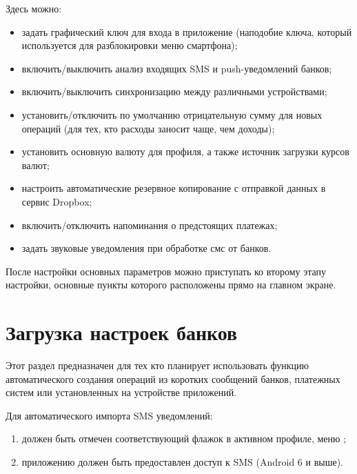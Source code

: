 \documentclass[a4paper,10pt,russian]{sphinxmanual}
\begin{document}
Здесь можно:
\begin{itemize}
\item {} 
задать графический ключ для входа в приложение (наподобие ключа, который используется для разблокировки меню смартфона);

\item {} 
включить/выключить анализ входящих SMS и push-уведомлений банков;

\item {} 
включить/выключить синхронизацию между различными устройствами;

\item {} 
установить/отключить по умолчанию отрицательную сумму для новых операций (для тех, кто расходы заносит чаще, чем доходы);

\item {} 
установить основную валюту для профиля, а также источник загрузки курсов валют;

\item {} 
настроить автоматические резервное копирование с отправкой данных в сервис Dropbox;

\item {} 
включить/отключить напоминания о предстоящих платежах;

\item {} 
задать звуковые уведомления при обработке смс от банков.

\end{itemize}

После настройки основных параметров можно приступать ко второму этапу настройки, основные пункты которого
расположены прямо на главном экране.


\section{Загрузка настроек банков}
\label{\detokenize{getting-started:id3}}
Этот раздел предназначен для тех кто планирует использовать функцию автоматического создания операций из коротких сообщений банков,
платежных систем или установленных на устройстве приложений.

Для автоматического импорта SMS уведомлений:
\begin{enumerate}
\def\theenumi{\arabic{enumi}}
\def\labelenumi{\theenumi .}
\makeatletter\def\p@enumii{\p@enumi \theenumi .}\makeatother
\item {} 
должен быть отмечен соответствующий флажок в активном профиле, меню ;

\item {} 
приложению должен быть предоставлен доступ к SMS (Android 6 и выше).

\end{enumerate}
\end{document}
